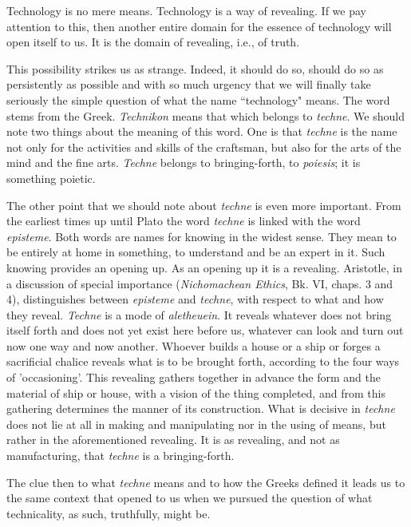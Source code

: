 \documentclass[12pt]{article}
\begin{document}
Technology is no mere means. Technology is a way of revealing. If we pay attention to this, then another entire domain for the essence of technology will open itself to us. It is the domain of revealing, i.e., of truth.

This possibility strikes us as strange. Indeed, it should do so, should do so as persistently as possible and with so much urgency that we will finally take seriously the simple question of what the name ``technology" means. The word stems from the Greek. \textit{Technikon} means that which belongs to \textit{techn{\-e}}. We should note two things about the meaning of this word. One is that \textit{techn{\-e}} is the name not only for the activities and skills of the craftsman, but also for the arts of the mind and the fine arts. \textit{Techn{\-e}} belongs to bringing-forth, to \textit{poi{\-e}sis}; it is something poietic.

The other point that we should note about \textit{techn{\-e}} is even more important. From the earliest times up until Plato the word \textit{techn{\-e}} is linked with the word \textit{epist{\-e}m{\-e}}. Both words are names for knowing in the widest sense. They mean to be entirely at home in something, to understand and be an expert in it. Such knowing provides an opening up. As an opening up it is a revealing. Aristotle, in a discussion of special importance (\textit{Nichomachean Ethics}, Bk. VI, chaps. 3 and 4), distinguishes between \textit{epist{\-e}m{\-e}} and \textit{techn{\-e}}, with respect to what and how they reveal. \textit{Techn{\-e}} is a mode of \textit{al{\-e}theuein}. It reveals whatever does not bring itself forth and does not yet exist here before us, whatever can look and turn out now one way and now another. Whoever builds a house or a ship or forges a sacrificial chalice reveals what is to be brought forth, according to the four ways of 'occasioning'. This revealing gathers together in advance the form and the material of ship or house, with a vision of the thing completed, and from this gathering determines the manner of its construction. What is decisive in \textit{techn{\-e}} does not lie at all in making and manipulating nor in the using of means, but rather in the aforementioned revealing. It is as revealing, and not as manufacturing, that \textit{techn{\-e}} is a bringing-forth.

The clue then to what \textit{techn{\-e}} means and to how the Greeks defined it leads us to the same context that opened to us when we pursued the question of what technicality, as such, truthfully, might be.
\end{document}
